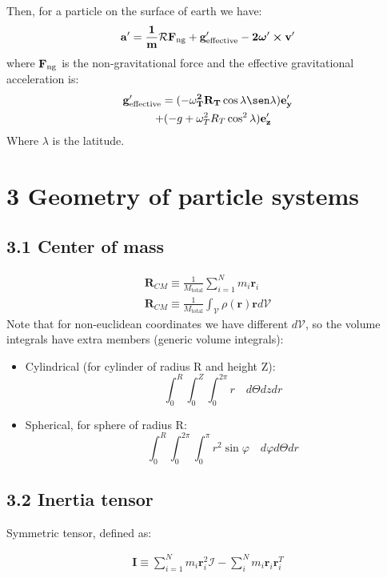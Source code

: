 \documentclass[a4paper,landscape,10pt]{cheatsheet}
\begin{document}
Then, for a particle on the surface of earth we have:
\begin{gather*}
  \bf{a}' = \frac{1}{m}\mathcal{R}\bf{F}_\text{ng} + \textbf{g}'_\text{effective} - 2\boldsymbol{\omega}'\cross \textbf{v}' \\
\end{gather*}
where $\bf{F}_\text{ng}$ is the non-gravitational force and the effective gravitational acceleration is:
\begin{gather*}
  \bf{g}'_\text{effective} = (-\omega^2_T R_T \cos\lambda\sen\lambda)\textbf{e}'_y \\
  \quad + (-g + \omega^2_T R_T \cos^2\lambda)\bf{e}'_z
\end{gather*}
Where $\lambda$ is the latitude.


\section*{3 Geometry of particle systems}
\subsection*{3.1 Center of mass}
\begin{gather*}
  \textbf{R}_{CM} \equiv \frac{1}{M_{\text{total}}}\sum_{i=1}^{N}m_i\textbf{r}_i \\
  \textbf{R}_{CM} \equiv \frac{1}{M_{\text{total}}}\int_{\mathcal{V}}\rho(\textbf{r})\textbf{r}d\mathcal{V}
\end{gather*}
Note that for non-euclidean coordinates we have different $d\mathcal{V}$, so the volume integrals have extra members
(generic volume integrals):
\begin{itemize}
  \item Cylindrical (for cylinder of radius R and height Z):
        $$
          \quad \int_{0}^{R}\int_{0}^{Z}\int_{0}^{2\pi}r \quad d\Theta dz dr
        $$
  \item Spherical, for sphere of radius R:
        $$
          \quad \int_{0}^{R}\int_{0}^{2\pi}\int_{0}^{\pi}r^2\sin{\varphi} \quad d\varphi d\Theta dr
        $$
\end{itemize}

\subsection*{3.2 Inertia tensor}
Symmetric tensor, defined as:

\begin{gather*}
  \textbf{I} \equiv \sum_{i=1}^{N} m_i\textbf{r}_i^2\mathcal{I} - \sum_{i}^{N}m_i\textbf{r}_i\textbf{r}_i^T\\
\end{gather*}
\end{document}
